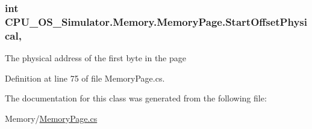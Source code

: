 \subsubsection[{Start\+Offset\+Physical}]{\setlength{\rightskip}{0pt plus 5cm}int C\+P\+U\+\_\+\+O\+S\+\_\+\+Simulator.\+Memory.\+Memory\+Page.\+Start\+Offset\+Physical\hspace{0.3cm}{\ttfamily [get]}, {\ttfamily [set]}}\label{class_c_p_u___o_s___simulator_1_1_memory_1_1_memory_page_af31a2243a3e68ec635315929859fa358}


The physical address of the first byte in the page 



Definition at line 75 of file Memory\+Page.\+cs.



The documentation for this class was generated from the following file\+:\begin{DoxyCompactItemize}
\item 
Memory/\hyperlink{_memory_page_8cs}{Memory\+Page.\+cs}\end{DoxyCompactItemize}

